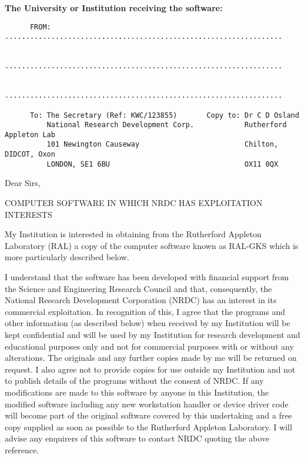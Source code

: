 \begin{footnotesize}
\begin{center}
{\bf The University or Institution receiving the software:}
\end{center}
\begin{verbatim}
      FROM: ..................................................................

            ..................................................................

            ..................................................................

      To: The Secretary (Ref: KWC/123855)       Copy to: Dr C D Osland
          National Research Development Corp.            Rutherford Appleton Lab
          101 Newington Causeway                         Chilton, DIDCOT, Oxon
          LONDON, SE1 6BU                                OX11 0QX
\end{verbatim}

Dear Sirs,
\begin{center}
COMPUTER SOFTWARE IN WHICH NRDC HAS EXPLOITATION INTERESTS
\end{center}
My Institution is interested in obtaining from the Rutherford Appleton
Laboratory (RAL) a copy of the computer software known as RAL-GKS which is
more particularly described below.

I understand that the software has been developed with financial support from
the Science and Engineering Research Council and that, consequently, the
National Research Development Corporation (NRDC) has an interest in its
commercial exploitation. In recognition of this, I agree that the programs and
other information (as described below) when received by my Institution will be
kept confidential and will be used by my Institution for research development
and educational purposes only and not for commercial purposes with or without
any alterations. The originals and any further copies made by me will be
returned on request. I also agree not to provide copies for use outside my
Institution and not to publish details of the programs without the consent of
NRDC. If any modifications are made to this software by anyone in this
Institution, the modified software including any new workstation handler or
device driver code will become part of the original software covered by this
undertaking and a free copy supplied as soon as possible to the Rutherford
Appleton Laboratory. I will advise any enquirers of this software to contact
NRDC quoting the above reference.


\end{footnotesize}
